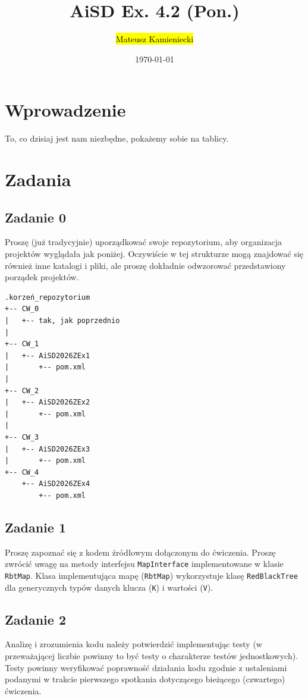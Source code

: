 \documentclass[twoside]{article}
\title{AiSD Ex. 4.2 (Pon.)}
\author{\hl{Mateusz Kamieniecki}}
\date{\today}
\begin{document}
\pagestyle{fancy}
\fancyhead{}
\fancyhead[L]{\@title}
\fancyhead[R]{\@author}
\fancyhead[C]{\@date}

\cfoot{\thepage\ / \pageref{LastPage}}


\newpage

\section{Wprowadzenie}

To, co dzisiaj jest nam niezbędne, pokażemy sobie na tablicy.

\section{Zadania}


\subsection{Zadanie 0}
Proszę (już tradycyjnie) uporządkować swoje repozytorium, aby organizacja projektów wyglądała jak poniżej. 
Oczywiście w tej strukturze mogą znajdować się również inne katalogi i pliki, ale proszę
dokładnie odwzorować przedstawiony porządek projektów.

\begin{verbatim}
.korzeń_repozytorium
+-- CW_0
|   +-- tak, jak poprzednio
|
+-- CW_1
|   +-- AiSD2026ZEx1
|       +-- pom.xml
|
+-- CW_2
|   +-- AiSD2026ZEx2
|       +-- pom.xml
|
+-- CW_3
|   +-- AiSD2026ZEx3
|       +-- pom.xml
+-- CW_4
    +-- AiSD2026ZEx4
        +-- pom.xml
\end{verbatim}

\newpage

\subsection{Zadanie 1}
Proszę zapoznać się z kodem źródłowym dołączonym do ćwiczenia.
Proszę zwrócić uwagę na metody interfejsu \verb|MapInterface| implementowane w klasie \verb|RbtMap|.
Klasa implementująca mapę (\verb|RbtMap|) wykorzystuje klasę \verb|RedBlackTree| dla generycznych typów danych klucza (\verb|K|) i wartości (\verb|V|).


\subsection{Zadanie 2}
Analizę i zrozumienia kodu należy potwierdzić implementując testy (w przeważającej liczbie powinny to być testy o charakterze testów jednostkowych).
Testy powinny weryfikować poprawność działania kodu zgodnie z ustaleniami podanymi w trakcie pierwszego spotkania dotyczącego bieżącego (czwartego) ćwiczenia.
\end{document}
